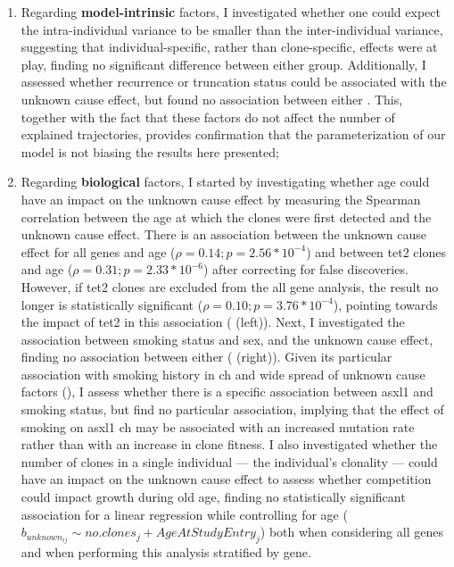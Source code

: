 \begin{enumerate}
    \item Regarding \textbf{model-intrinsic} factors, I investigated whether one could expect the intra-individual variance to be smaller than the inter-individual variance, suggesting that individual-specific, rather than clone-specific, effects were at play, finding no significant difference between either group. Additionally, I assessed whether recurrence or truncation status could be associated with the unknown cause effect, but found no association between either . This, together with the fact that these factors do not affect the number of explained trajectories, provides confirmation that the parameterization of our model is not biasing the results here presented;

    \item Regarding \textbf{biological} factors, I started by investigating whether age could have an impact on the unknown cause effect by measuring the Spearman correlation between the age at which the clones were first detected and the unknown cause effect. There is an association between the unknown cause effect for all genes and age ($\rho = 0.14; p = 2.56*10^{-4}$) and between \ac{tet2} clones and age ($\rho = 0.31; p = 2.33*10^{-6}$) after correcting for false discoveries. However, if \ac{tet2} clones are excluded from the all gene analysis, the result no longer is statistically significant ($\rho = 0.10; p = 3.76*10^{-4}$), pointing towards the impact of \ac{tet2} in this association ( (left)). Next, I investigated the association between smoking status and sex, and the unknown cause effect, finding no association between either ( (right)). Given its particular association with smoking history in \ac{ch} \cite{Dawoud2020-af} and wide spread of unknown cause factors (), I assess whether there is a specific association between \ac{asxl1} and smoking status, but find no particular association, implying that the effect of smoking on \ac{asxl1} \ac{ch} may be associated with an increased mutation rate rather than with an increase in clone fitness. I also investigated whether the number of clones in a single individual --- the individual's clonality --- could have an impact on the unknown cause effect to assess whether competition could impact growth during old age, finding no statistically significant association for a linear regression while controlling for age ($b_{unknown_{ij}} \sim no.clones_j + AgeAtStudyEntry_j$) both when considering all genes and when performing this analysis stratified by gene.
\end{enumerate}

